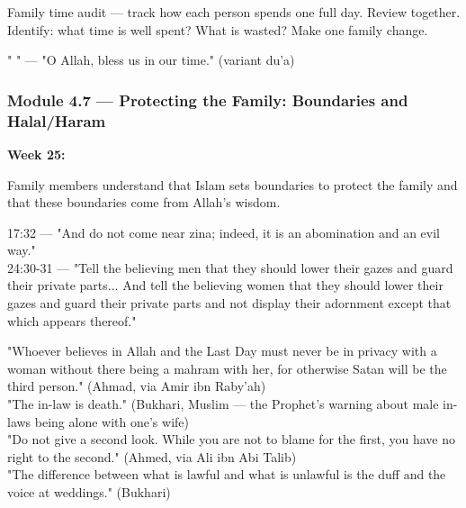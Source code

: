 \documentclass[11pt,a4paper]{article}
\begin{document}
\begin{activitybox} Family time audit --- track how each person spends one full day. Review together. Identify: what time is well spent? What is wasted? Make one family change. \end{activitybox}

\begin{duabox} "    " --- "O Allah, bless us in our time." (variant du'a) \end{duabox}

\vspace{6pt}\noindent{\color{border}\rule{\textwidth}{0.5pt}}\vspace{6pt}

\subsubsection*{Module 4.7 --- Protecting the Family: Boundaries and Halal/Haram}
\textbf{Week 25:} 

\begin{outcomebox} Family members understand that Islam sets boundaries to protect the family and that these boundaries come from Allah's wisdom. \end{outcomebox}

\begin{quranbox} 17:32 --- "And do not come near zina; indeed, it is an abomination and an evil way." \\ 24:30-31 --- "Tell the believing men that they should lower their gazes and guard their private parts... And tell the believing women that they should lower their gazes and guard their private parts and not display their adornment except that which appears thereof." \end{quranbox}

\begin{hadithbox} "Whoever believes in Allah and the Last Day must never be in privacy with a woman without there being a mahram with her, for otherwise Satan will be the third person." (Ahmad, via Amir ibn Raby'ah) \\ "The in-law is death." (Bukhari, Muslim --- the Prophet's warning about male in-laws being alone with one's wife) \\ "Do not give a second look. While you are not to blame for the first, you have no right to the second." (Ahmed, via Ali ibn Abi Talib) \\ "The difference between what is lawful and what is unlawful is the duff and the voice at weddings." (Bukhari) \end{hadithbox}
\end{document}
